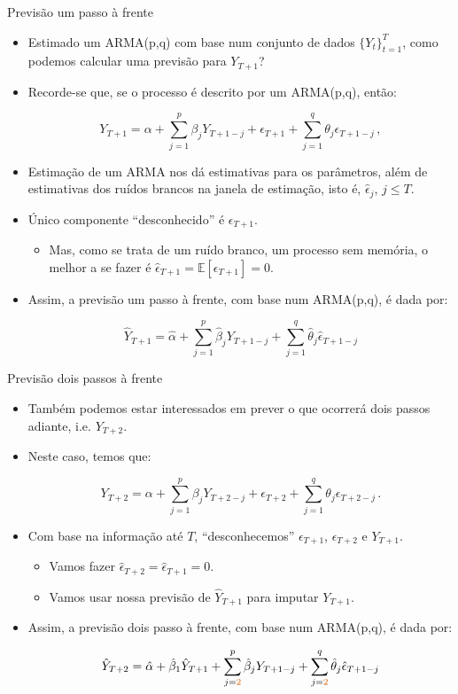 \documentclass[11pt]{beamer}
\begin{document}
\begin{frame}{Previsão um passo à frente}
	\begin{itemize}
		\item Estimado um ARMA(p,q) com base num conjunto de dados $\{Y_t\}_{t=1}^T$, como podemos calcular uma previsão para $Y_{T+1}$?
		\item Recorde-se que, se o processo é descrito por um ARMA(p,q), então:
		
		$$Y_{T+1} = \alpha + \sum_{j=1}^{p} \beta_j Y_{T+1-j} + \epsilon_{T+1} + \sum_{j=1}^q \theta_j \epsilon_{T+1-j} \, ,  $$
		
		\item Estimação de um ARMA nos dá estimativas para os parâmetros, além de estimativas dos ruídos brancos na janela de estimação, isto é, $\hat \epsilon_{j}$, $j \leq T$.
		\item Único componente ``desconhecido'' é $\epsilon_{T+1}$.
		\begin{itemize}
				\item Mas, como se trata de um ruído branco, um processo sem memória, o melhor a se fazer é $\hat \epsilon_{T+1} = \mathbb{E}[\epsilon_{T+1}] = 0$.
		\end{itemize}
		\item Assim, {\color{blue}a previsão um passo à frente}, com base num ARMA(p,q), é dada por:
		
		$$\hat Y_{T+1} = \hat \alpha + \sum_{j=1}^p \hat{\beta}_j Y_{T+1-j} + \sum_{j=1}^q \hat \theta_j \hat \epsilon_{T+1-j}$$
	
	\end{itemize}
\end{frame}

\begin{frame}{Previsão dois passos à frente}
	\begin{itemize}
		\item Também podemos estar interessados em prever o que ocorrerá dois passos adiante, i.e. $Y_{T+2}$.
		\item Neste caso, temos que:
		
		$$Y_{T+2} = \alpha + \sum_{j=1}^p \beta_{j} 	Y_{T+2-j} + \epsilon_{T+2} + \sum_{j=1}^q \theta_j \epsilon_{T+2-j}\, .$$
		
		\item Com base na informação até $T$, ``desconhecemos'' $\epsilon_{T+1}$, $\epsilon_{T+2}$ e $Y_{T+1}$.
		\begin{itemize}
			\item Vamos fazer $\hat \epsilon_{T+2} = \hat \epsilon_{T+1} = 0$.
			\item Vamos usar nossa previsão de $\hat{Y}_{T+1}$ para imputar $Y_{T+1}$.
		\end{itemize}
			\item Assim, {\color{blue}a previsão dois passo à frente}, com base num ARMA(p,q), é dada por:
		
		$$\hat Y_{T+2} = \hat \alpha + \hat \beta_1 \hat Y_{T+1} + \sum_{j={\color{red}2}}^p \hat{\beta}_j Y_{T+1-j} + \sum_{j={\color{red}2}}^q \hat \theta_j \hat\epsilon_{T+1-j}$$
	\end{itemize}
\end{frame}
\end{document}

